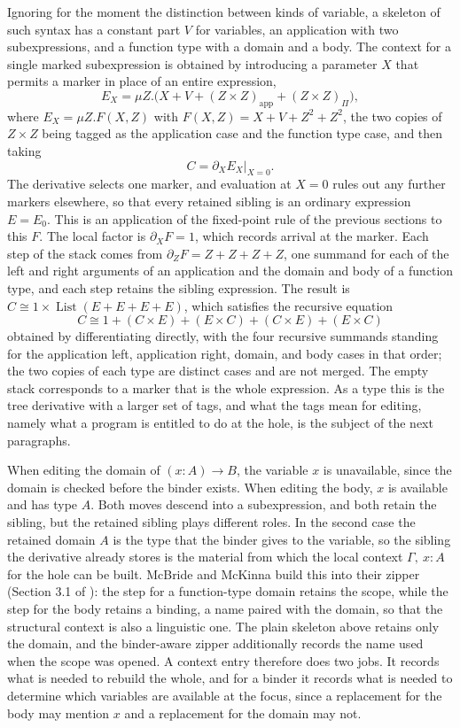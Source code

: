 \documentclass[11pt]{article}
\begin{document}
Ignoring for the moment the distinction between kinds of variable, a skeleton of such syntax has a constant part $V$ for variables, an application with two subexpressions, and a function type with a domain and a body. The context for a single marked subexpression is obtained by introducing a parameter $X$ that permits a marker in place of an entire expression,
\[
E_X=\mu Z.\bigl(X+V+(Z\times Z)_{\mathrm{app}}+(Z\times Z)_{\Pi}\bigr),
\]
where $E_X=\mu Z.F(X,Z)$ with $F(X,Z)=X+V+Z^2+Z^2$, the two copies of $Z\times Z$ being tagged as the application case and the function type case, and then taking
\[
C=\left.\partial_X E_X\right|_{X=0}.
\]
The derivative selects one marker, and evaluation at $X=0$ rules out any further markers elsewhere, so that every retained sibling is an ordinary expression $E=E_0$. This is an application of the fixed-point rule of the previous sections to this $F$. The local factor is $\partial_X F=1$, which records arrival at the marker. Each step of the stack comes from $\partial_Z F=Z+Z+Z+Z$, one summand for each of the left and right arguments of an application and the domain and body of a function type, and each step retains the sibling expression. The result is $C\cong 1\times\operatorname{List}(E+E+E+E)$, which satisfies the recursive equation
\[
C\cong 1 + (C\times E) + (E\times C) + (C\times E) + (E\times C)
\]
obtained by differentiating directly, with the four recursive summands standing for the application left, application right, domain, and body cases in that order; the two copies of each type are distinct cases and are not merged. The empty stack corresponds to a marker that is the whole expression. As a type this is the tree derivative with a larger set of tags, and what the tags mean for editing, namely what a program is entitled to do at the hole, is the subject of the next paragraphs.

When editing the domain of $(x{:}A)\to B$, the variable $x$ is unavailable, since the domain is checked before the binder exists. When editing the body, $x$ is available and has type $A$. Both moves descend into a subexpression, and both retain the sibling, but the retained sibling plays different roles. In the second case the retained domain $A$ is the type that the binder gives to the variable, so the sibling the derivative already stores is the material from which the local context $\Gamma,\ x{:}A$ for the hole can be built. McBride and McKinna build this into their zipper (Section 3.1 of \cite{mcbridemckinna2004}): the step for a function-type domain retains the scope, while the step for the body retains a binding, a name paired with the domain, so that the structural context is also a linguistic one. The plain skeleton above retains only the domain, and the binder-aware zipper additionally records the name used when the scope was opened. A context entry therefore does two jobs. It records what is needed to rebuild the whole, and for a binder it records what is needed to determine which variables are available at the focus, since a replacement for the body may mention $x$ and a replacement for the domain may not.
\end{document}
